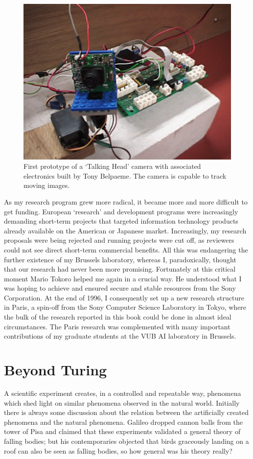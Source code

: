 \begin{figure}[htbp]
  \centerline{\includegraphics[width=.70\textwidth]{chap1/figs/eye}}
\caption{ First prototype of a `Talking Head' camera with 
associated electronics built by Tony Belpaeme. The camera is capable to track moving images. }
\label{f:plate7}
\end{figure}

As my research program grew more radical, it became more 
and more difficult to get funding. 
European `research' and development programs were 
increasingly demanding short-term projects that targeted information
technology products already available on the American or Japanese 
market. Increasingly, my
research proposals were being rejected and running projects were
cut off,
as reviewers could not see direct short-term 
commercial benefits. All this was endangering the further existence
of my Brussels laboratory, whereas I, paradoxically, thought that
our research had never been more promising. 
Fortunately at this critical moment Mario Tokoro
helped me again in a crucial way. He understood what I was
hoping to achieve and ensured secure and stable resources from 
the Sony Corporation. At the end of 1996, I consequently set up a new research
structure in Paris, a spin-off from the Sony Computer Science
Laboratory in Tokyo, where the bulk of the research reported
in this book could be done in almost ideal circumstances. 
The Paris research was complemented with many important 
contributions of my graduate students
at the VUB AI laboratory in Brussels. 

\section{Beyond Turing}

A scientific experiment creates, in a controlled
and repeatable way, phenomena which shed light on
similar phenomena observed in the natural
world. Initially there is
always some discussion about the relation between 
the artificially created phenomena and the natural
phenomena. Galileo dropped cannon balls from
the tower of Pisa and claimed that these experiments validated 
a general theory of falling bodies; but his contemporaries 
objected that birds graceously landing on a roof can
also be seen as falling bodies, so how general was 
his theory really?  

